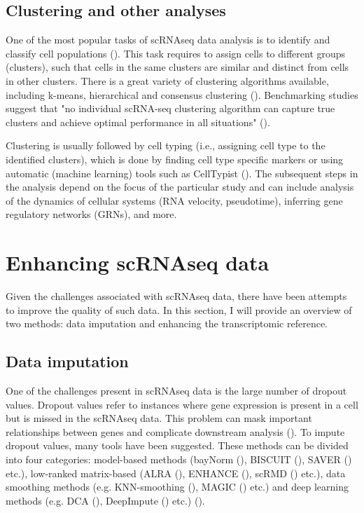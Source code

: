 \subsection{Clustering and other analyses}

One of the most popular tasks of scRNAseq data analysis is to identify and classify cell populations (\cite{Andrews2018}).
This task requires to assign cells to different groups (clusters),
such that cells in the same clusters are similar and distinct from cells in other clusters.
There is a great variety of clustering algorithms available,
including k-means, hierarchical and consensus clustering (\cite{Peng2020}).
Benchmarking studies suggest that "no individual scRNA-seq clustering algorithm can capture true clusters and achieve
optimal performance in all situations" (\cite{Peng2020}).

Clustering is usually followed by cell typing (i.e., assigning cell type to the identified clusters),
which is done by finding cell type specific markers
or using automatic (machine learning) tools such as CellTypist (\cite{Dom2022}).
The subsequent steps in the analysis depend on the focus of the particular study and can include
analysis of the dynamics of cellular systems (RNA velocity, pseudotime),
inferring gene regulatory networks (GRNs), and more.

\section{Enhancing scRNAseq data}

Given the challenges associated with scRNAseq data, there have been attempts to improve the quality of such data.
In this section, I will provide an overview of two methods: data imputation and enhancing the transcriptomic reference.

\subsection{Data imputation}

One of the challenges present in scRNAseq data is the large number of dropout values.
Dropout values refer to instances where gene expression is present in a cell but is missed in the scRNAseq data.
This problem can mask important relationships between genes and complicate downstream analysis (\cite{Wang2022}).
To impute dropout values, many tools have been suggested.
These methods can be divided into four categories:
model-based methods (bayNorm (\cite{Tang2019}), BISCUIT (\cite{Azizi2017}), SAVER (\cite{Huang2018}) etc.),
low-ranked matrix-based (ALRA (\cite{Linderman2022}), ENHANCE (\cite{Wagner2019}), scRMD (\cite{Chen2020}) etc.),
data smoothing methods (e.g. KNN-smoothing (\cite{Wagner2017}), MAGIC (\cite{Dijk2018}) etc.) and
deep learning methods (e.g. DCA (\cite{Eraslan2019}), DeepImpute (\cite{Arisdakessian2019}) etc.) (\cite{Wang2022}).

